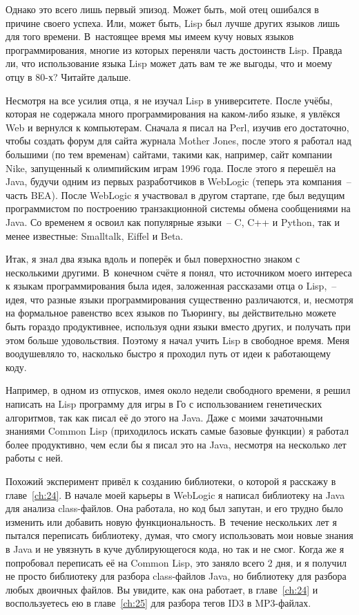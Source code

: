 Однако это всего лишь первый эпизод. Может быть, мой отец ошибался в причине своего
успеха. Или, может быть, Lisp был лучше других языков лишь для того времени. В~настоящее
время мы имеем кучу новых языков программирования, многие из которых переняли часть
достоинств Lisp. Правда ли, что использование языка Lisp может дать вам те же выгоды,
что и моему отцу в 80-х? Читайте дальше.

Несмотря на все усилия отца, я не изучал Lisp в университете. После учёбы, которая
не содержала много программирования на каком-либо языке, я увлёкся Web и вернулся к
компьютерам. Сначала я писал на Perl, изучив его достаточно, чтобы создать форум для сайта
журнала Mother Jones, после этого я работал над большими (по тем временам) сайтами,
такими как, например, сайт компании Nike, запущенный к олимпийским играм 1996 года. После
этого я перешёл на Java, будучи одним из первых разработчиков в WebLogic (теперь эта
компания~-- часть BEA). После WebLogic я участвовал в другом стартапе, где был ведущим
программистом по построению транзакционной системы обмена сообщениями на Java. Со временем
я освоил как популярные языки~-- C, C++ и Python, так и менее известные: Smalltalk, Eiffel и Beta.

Итак, я знал два языка вдоль и поперёк и был поверхностно знаком с несколькими другими.
В~конечном счёте я понял, что источником моего интереса к языкам программирования
была идея, заложенная рассказами отца о Lisp,~-- идея, что разные языки
программирования существенно различаются, и, несмотря на формальное равенство всех языков
по Тьюрингу, вы действительно можете быть гораздо продуктивнее, используя
одни языки вместо других, и получать при этом больше удовольствия. Поэтому я начал учить
Lisp в свободное время. Меня воодушевляло то, насколько быстро я проходил путь от идеи к
работающему коду.

Например, в одном из отпусков, имея около недели свободного времени, я решил написать
на Lisp программу для игры в Го с использованием генетических алгоритмов, так как писал её
до этого на Java. Даже с моими зачаточными знаниями Common Lisp (приходилось искать
самые базовые функции) я работал более продуктивно, чем если бы я писал это на Java,
несмотря на несколько лет работы с ней.

Похожий эксперимент привёл к созданию библиотеки, о которой я расскажу в главе~\ref{ch:24}. В
начале моей карьеры в WebLogic я написал библиотеку на Java для анализа class-файлов.
Она работала, но код был запутан, и его трудно было изменить или добавить новую функциональность.
В~течение нескольких лет я пытался переписать библиотеку,
думая, что смогу использовать мои новые знания в Java и не увязнуть в куче дублирующегося
кода, но так и не смог. Когда же я попробовал переписать её на Common Lisp, это заняло всего
2 дня, и я получил не просто библиотеку для разбора class-файлов Java, но библиотеку для
разбора любых двоичных файлов. Вы увидите, как она работает, в главе~\ref{ch:24} и воспользуетесь
ею в главе~\ref{ch:25} для разбора тегов ID3 в MP3-файлах.

